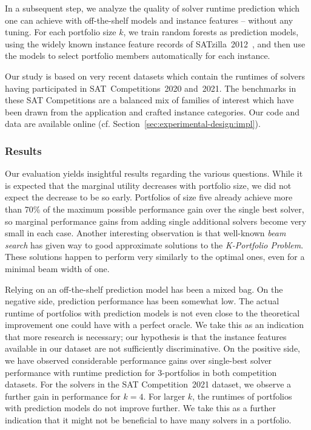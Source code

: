 \documentclass[runningheads]{llncs}
\begin{document}
In a subsequent step, we analyze the quality of solver runtime prediction which one can achieve with off-the-shelf models and instance features -- without any tuning.
For each portfolio size $k$, we train random forests as prediction models, using the widely known instance feature records of SATzilla~2012~\cite{xu2012satzilla2012}, and then use the models to select portfolio members automatically for each instance. 

Our study is based on very recent datasets which contain the runtimes of solvers having participated in SAT~Competitions~2020 and~2021. 
The benchmarks in these SAT Competitions are a balanced mix of families of interest which have been drawn from the application and crafted instance categories. 
Our code and data are available online (cf. Section~\ref{sec:experimental-design:impl}).

\subsubsection{Results}

Our evaluation yields insightful results regarding the various questions. 
While it is expected that the marginal utility decreases with portfolio size, we did not expect the decrease to be so early. 
Portfolios of size five already achieve more than 70\% of the maximum possible performance gain over the single best solver, so marginal performance gains from adding single additional solvers become very small in each case. 
Another interesting observation is that well-known \emph{beam search} has given way to good approximate solutions to the \emph{K-Portfolio Problem}. 
These solutions happen to perform very similarly to the optimal ones, even for a minimal beam width of one.

Relying on an off-the-shelf prediction model has been a mixed bag. 
On the negative side, prediction performance has been somewhat low. 
The actual runtime of portfolios with prediction models is not even close to the theoretical improvement one could have with a perfect oracle.
We take this as an indication that more research is necessary; our hypothesis is that the instance features available in our dataset are not sufficiently discriminative. 
On the positive side, we have observed considerable performance gains over single-best solver performance with runtime prediction for $3$-portfolios in both competition datasets. 
For the solvers in the SAT Competition~2021 dataset, we observe a further gain in performance for $k = 4$. 
For larger $k$, the runtimes of portfolios with prediction models do not improve further. 
We take this as a further indication that it might not be beneficial to have many solvers in a portfolio. 
\end{document}
